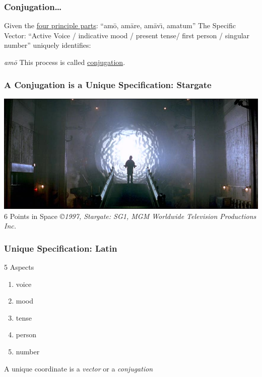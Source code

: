 \documentclass[slidestop,compress,mathserif]{beamer}
\begin{document}
\begin{frame}
	\frametitle{Conjugation\ldots}
	Given the \underline{four principle parts}:  ``am\={o}, am\={a}re, am\={a}v\={\i}, amatum''
	\vskip 0.5cm
	The Specific Vector: ``Active Voice / indicative mood / present tense/ first person / singular number'' uniquely identifies:
	\vskip 0.5cm
	\begin{center}
		\emph{am\={o}}
		\vskip 0.5cm
		This process is called \underline{conjugation}.
	\end{center}
\end{frame}

\begin{frame}
	\frametitle{A Conjugation is a Unique Specification:  Stargate}
	\begin{center}
		\includegraphics[scale=0.25]{img/stargate.jpg}
		\vskip 0.5cm
		6 Points in Space
		\vskip 0.5cm
		\emph{\copyright 1997, \emph{Stargate:  SG1},  MGM Worldwide Television Productions Inc.}
	\end{center}
\end{frame}

\begin{frame}
	\frametitle{Unique Specification:  Latin}
	5 Aspects
	\begin{enumerate}
		\item voice
		\pause
		\item mood
		\pause
		\item tense
		\pause
		\item person
		\pause
		\item number
		\pause
	\end{enumerate}
	\vskip 0.5cm
	A unique coordinate is a \emph{vector} or a \emph{conjugation}
\end{frame}
\end{document}
